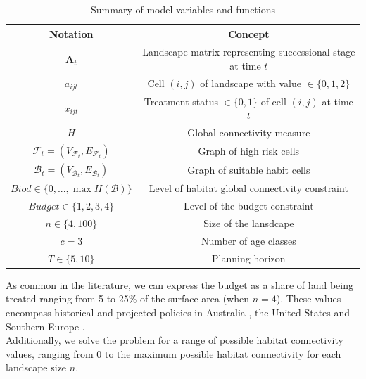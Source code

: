 \begin{table}[h]
\centering
\onehalfspacing
\begin{tabular}{|c|c|}
\hline
Notation & Concept \\
\hline \hline
$\mathbf{A}_t$ & Landscape matrix representing successional stage at time $t$ \\
$a_{ijt}$ & Cell $(i,j)$ of landscape with value $\in \{0,1,2\}$\\ 
$x_{ijt}$ & Treatment status $\in\{0,1\}$ of cell $(i,j)$ at time $t$ \\
$H$ & Global connectivity measure\\
$\mathcal{F}_t = (V_{\mathcal{F}_t}, E_{\mathcal{F}_t})$ & Graph of high risk cells\\
$\mathcal{B}_t = (V_{\mathcal{B}_t}, E_{\mathcal{B}_t})$ & Graph of suitable habit cells\\
\hline \hline
$Biod \in \{0,...,\max H(\mathcal{B})\}$ & Level of habitat global connectivity constraint\\
$Budget \in \{1,2,3,4\}$ & Level of the budget constraint\\
$n \in \{4,100\}$ & Size of the lansdcape\\
$c = 3$ & Number of age classes \\
$T \in \{5,10\} $ & Planning horizon\\
\hline 
\end{tabular}
\caption{Summary of model variables and functions}
\end{table}
As common in the literature, we can express the budget as a share of land being treated ranging from %
5 to 25\% of the surface area (when $n=4$). These values encompass historical and projected policies in Australia \citep{burrows2013}, the United States \citep{GAO2019} and Southern Europe \citep{Fernandes2013}.
\\
Additionally, we solve the problem for a range of possible habitat connectivity values, ranging from $0$ to the maximum possible habitat connectivity for each landscape size $n$.

